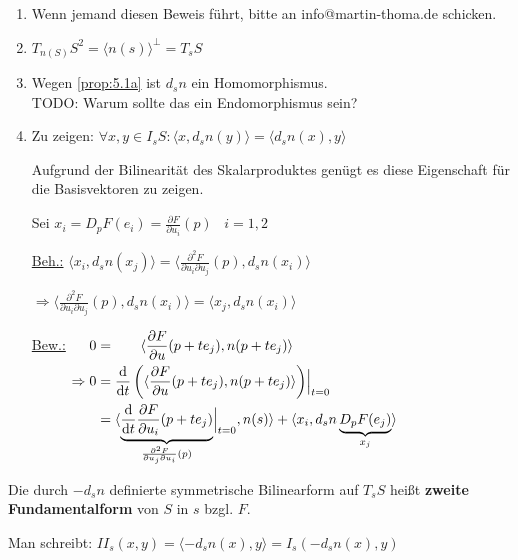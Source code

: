 \begin{beweis}\leavevmode
    \begin{enumerate}[label=\alph*)]
        \item Wenn jemand diesen Beweis führt, bitte an info@martin-thoma.de
              schicken.
        \item $T_{n(S)} S^2 = \langle n(s) \rangle^\perp = T_s S$
        \item Wegen \cref{prop:5.1a} ist $d_s n$ ein Homomorphismus.\\
              TODO: Warum sollte das ein Endomorphismus sein?
        \item Zu zeigen: $\forall x,y \in I_s S: \langle x, d_s n (y) \rangle = \langle d_s n(x), y \rangle$

        Aufgrund der Bilinearität des Skalarproduktes genügt es diese Eigenschaft
        für die Basisvektoren zu zeigen.

        Sei $x_i = D_p F(e_i) = \frac{\partial F}{\partial u_i} (p)\;\;\; i = 1,2$

        \underline{Beh.:} 
          $\langle x_i, d_s n(x_j) \rangle = \langle \frac{\partial^2 F}{\partial u_i \partial u_j} (p), d_s n (x_i) \rangle$

        $\Rightarrow \langle \frac{\partial^2 F}{\partial u_i \partial u_j} (p), d_s n (x_i) \rangle = \langle x_j, d_s n (x_i) \rangle$

        \underline{Bew.:} $
        \begin{aligned}[t]
            0 &= \hphantom{\frac{\mathrm{d}}{\mathrm{d}t} \left (\right.} \langle \frac{\partial F}{\partial u} (p + t e_j), n(p + t e_j) \rangle\\
\Rightarrow 0 &= \frac{\mathrm{d}}{\mathrm{d}t} \left (\langle \frac{\partial F}{\partial u} (p + t e_j), n(p + t e_j) \rangle \right) \Bigr |_{t=0}\\
              &= \langle \underbrace{\frac{\mathrm{d}}{\mathrm{d}t} \frac{\partial F}{\partial u_i} (p + t e_j)}_{\frac{\partial^2 F}{\partial u_j \partial u_i} (p)} \Bigr |_{t=0}, n(s) \rangle + \langle x_i, d_s n \underbrace{D_p F (e_j)}_{x_j}\rangle
        \end{aligned}$
    \end{enumerate}
\end{beweis}

\begin{definition}%
    Die durch $-d_s n$ definierte symmetrische Bilinearform auf $T_s S$ heißt
    \textbf{zweite Fundamentalform} von $S$ in $s$ bzgl. $F$.

    Man schreibt: $II_s(x,y) =  \langle - d_s n(x), y \rangle = I_s (-d_s n(x), y)$
\end{definition}

